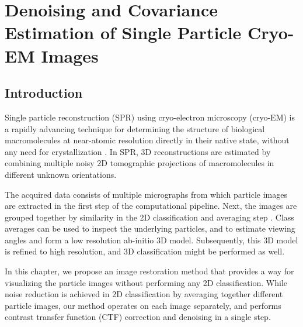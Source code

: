 




%

%




\chapter{Denoising and Covariance Estimation of Single Particle Cryo-EM Images}
 
 
\section{Introduction}
Single particle reconstruction (SPR) using cryo-electron microscopy (cryo-EM) is 
a rapidly advancing technique for determining the structure of biological
macromolecules at near-atomic resolution directly in their native state, without any need for crystallization \cite{cryoem_rev, rev2, nogales, sigworth_rev, kuhlbrandt}. In SPR, 3D reconstructions are estimated by combining multiple noisy 2D tomographic projections
of macromolecules in different unknown orientations.

The acquired data consists of multiple micrographs from which particle images 
are extracted in the first step of the computational pipeline. Next, the images are grouped together
by similarity in the 2D classification and averaging step \cite{zhao,park}. Class averages can be used
to inspect the underlying particles, and
to estimate viewing angles and form a low resolution ab-initio 3D model. Subsequently, this 3D model 
is refined to high resolution, and 3D classification might be performed as well. 

In this chapter, we propose an image restoration method that provides a way for 
visualizing the particle images without performing any 2D classification. 
While noise reduction is achieved in 2D classification by averaging together 
different particle images, our method operates on each image separately, and 
performs contrast transfer function (CTF) correction and denoising in a single 
step. 



